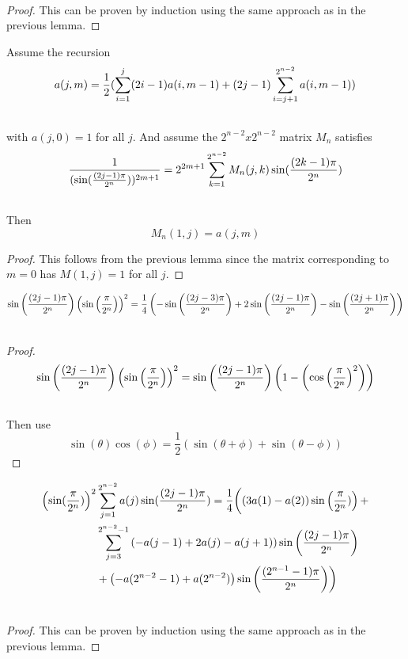 \documentclass[fleqn,a4paper,9pt]{article}
\begin{document}
\begin{flushleft}
\begin{corollary}
\begin{align}
\end{align}
\end {corollary}
\begin{proof}
This can be proven by induction using the same approach as in the previous lemma.
\end{proof}
\begin{corollary}
Assume the recursion
\begin{align}
a(j,m)=\frac{1}{2}(\sum_{i=1}^j(2i-1)a(i,m-1)+(2j-1)\sum_{i=j+1}^{2^{n-2}}a(i,m-1))\\\notag
\end{align}
with $a(j,0)=1$ for all $j$.
And assume the $2^{n-2}x2^{n-2}$ matrix $M_n$ satisfies
\begin{align}
 \frac{1}{(\sin(\frac{(2j-1)\pi}{2^n}))^{2m+1}}&=2^{2m+1} \sum_{k=1}^{2^{n-2}}M_n(j,k)\sin(\frac{(2k-1)\pi}{2^n})\\\notag
\end{align}
Then $$M_n(1,j)=a(j,m)$$
\end {corollary}
\begin{proof}
This follows from the previous lemma since the matrix corresponding to $m=0$ has $M(1,j)=1$ for all $j$.
\end{proof}
\begin{lemma}
\begin{align}
\sin\left(\frac{(2j-1)\pi}{2^n}\right)\left(\sin\left(\frac{\pi}{2^n}\right)\right)^2&=\frac{1}{4}\left(-\sin\left(\frac{(2j-3)\pi}{2^n}\right)+2\sin\left(\frac{(2j-1)\pi}{2^n}\right)-\sin\left(\frac{(2j+1)\pi}{2^n}\right)\right)\\\notag
\end{align}
\end{lemma}
\begin{proof}
\begin{align}
\sin\left(\frac{(2j-1)\pi}{2^n}\right)\left(\sin\left(\frac{\pi}{2^n}\right)\right)^2&=\sin\left(\frac{(2j-1)\pi}{2^n}\right)\left(1-\left(\cos\left(\frac{\pi}{2^n}\right)^2\right)\right)\\\notag
\end{align}
Then use $$\sin(\theta)\cos(\phi)=\frac{1}{2}\left(\sin(\theta+\phi)+\sin(\theta-\phi)\right)$$
\end{proof}
\begin{corollary}
\begin{align}
\left(\sin(\frac{\pi}{2^n})\right)^2&\sum_{j=1}^{2^{n-2}}a(j)\sin(\frac{(2j-1)\pi}{2^n})=\frac{1}{4}\biggl(\left(3a(1)-a(2)\right)\sin\left(\frac{\pi}{2^n})\right)+\\\notag
&\sum_{j=3}^{2^{n-2}-1}\left(-a(j-1)+2a(j)-a(j+1)\right)\sin\left(\frac{(2j-1)\pi}{2^n}\right)\\\notag
&+\left(-a(2^{n-2}-1)+a(2^{n-2})\right)\sin\left(\frac{(2^{n-1}-1)\pi}{2^n}\right)\biggr)\\\notag
\end{align}
\end {corollary}
\begin{proof}
This can be proven by induction using the same approach as in the previous lemma.
\end{proof}
\begin{corollary}\label{induct}


\end{corollary}
\end{flushleft}
\end{document}
